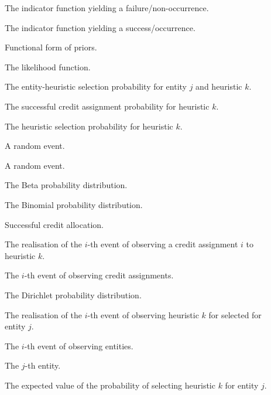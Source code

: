 \begin{description}
	\item [\parbox{2cm}{$\mathbbm{1}_{0}$}] \parbox{12.5cm}{The indicator function yielding a failure/non-occurrence.}
	\item [\parbox{2cm}{$\mathbbm{1}_{1}$}] \parbox{12.5cm}{The indicator function yielding a success/occurrence.}
	\item [\parbox{2cm}{$\mathcal{A}(v)$}] \parbox{12.5cm}{Functional form of priors.}
	\item [\parbox{2cm}{$\mathcal{L}$}] \parbox{12.5cm}{The likelihood function.}
	\item [\parbox{2cm}{$\phi_{j,k}$}] \parbox{12.5cm}{The entity-heuristic selection probability for entity $j$ and heuristic $k$.}
	\item [\parbox{2cm}{$\psi_{k}$}] \parbox{12.5cm}{The successful credit assignment probability for heuristic $k$.}
	\item [\parbox{2cm}{$\theta_{k}$}] \parbox{12.5cm}{The heuristic selection probability for heuristic $k$.}
	\item [\parbox{2cm}{$A$}] \parbox{12.5cm}{A random event.}
	\item [\parbox{2cm}{$B$}] \parbox{12.5cm}{A random event.}
	\item [\parbox{2cm}{$Beta$}] \parbox{12.5cm}{The Beta probability distribution.}
	\item [\parbox{2cm}{$Bin$}] \parbox{12.5cm}{The Binomial probability distribution.}
	\item [\parbox{2cm}{$c_{1}$}] \parbox{12.5cm}{Successful credit allocation.}
	\item [\parbox{2cm}{$c_{i,k}$}] \parbox{12.5cm}{The realisation of the $i$-th event of observing a credit assignment $i$ to heuristic $k$.}
	\item [\parbox{2cm}{$c_{i}$}] \parbox{12.5cm}{The $i$-th event of observing credit assignments.}
	\item [\parbox{2cm}{$Dir$}] \parbox{12.5cm}{The Dirichlet probability distribution.}
	\item [\parbox{2cm}{$e_{i,j,k}$}] \parbox{12.5cm}{The realisation of the $i$-th event of observing heuristic $k$ for selected for entity $j$.}
	\item [\parbox{2cm}{$e_{i}$}] \parbox{12.5cm}{The $i$-th event of observing entities.}
	\item [\parbox{2cm}{$e_{j}$}] \parbox{12.5cm}{The $j$-th entity.}
	\item [\parbox{2cm}{$E[\phi_{j,k}]$}] \parbox{12.5cm}{The expected value of the probability of selecting heuristic $k$ for entity $j$.}

\end{description}
